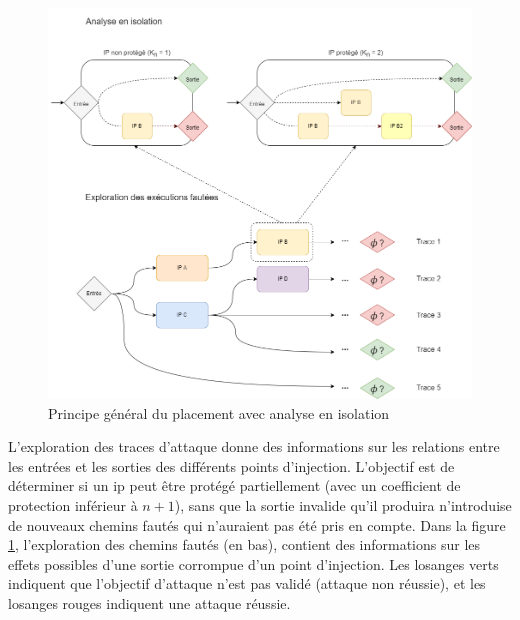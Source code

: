                 \begin{figure}[ht]\centering
                    \includegraphics[scale=0.39]{ch5-placement/img/placement-isolation.drawio.png}
                    \caption{Principe général du placement avec analyse en isolation}
                    \label{fig:placement-isol}
                \end{figure}
            
                L'exploration des traces d'attaque donne des informations sur les relations entre les entrées et les sorties des différents points d'injection.   
                L'objectif est de déterminer si un \gls{ip} peut être protégé partiellement (avec un coefficient de protection inférieur à $n + 1$), sans que la sortie invalide qu'il produira n'introduise de nouveaux chemins fautés qui n'auraient pas été pris en compte.            
                Dans la figure \ref{fig:placement-isol}, l'exploration des chemins fautés (en bas), contient des informations sur les effets possibles d'une sortie corrompue d'un point d'injection. Les losanges verts indiquent que l'objectif d'attaque n'est pas validé (attaque non réussie), et les losanges rouges indiquent une attaque réussie.
                
